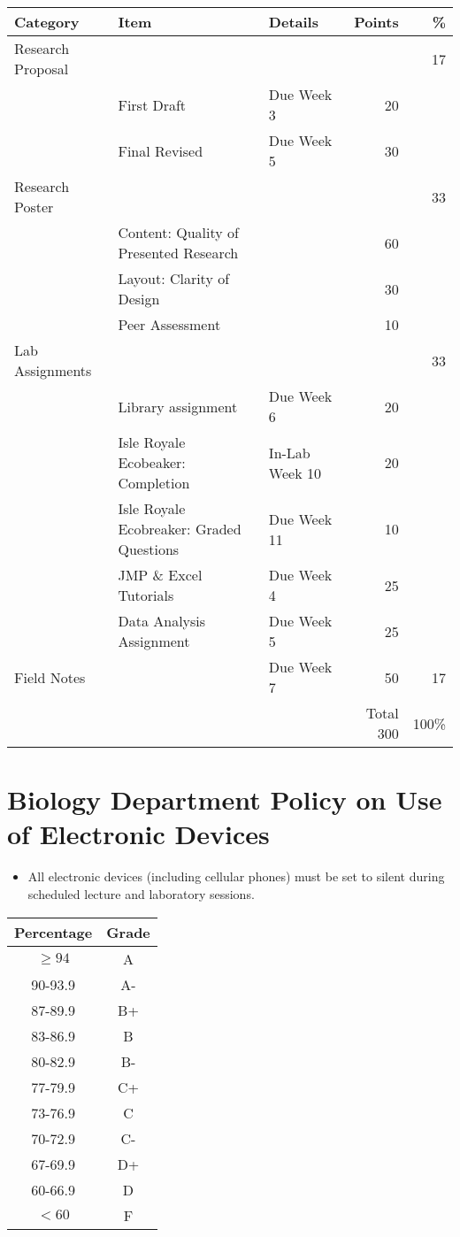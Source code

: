 \documentclass{tufte-handout}
\begin{document}
\begin{fullwidth}
\begin{table}
\begin{tabular}{l l l r r}
Category & Item & Details & Points  & \% \\
\hline
Research Proposal & & &  & 17\\
& First Draft & Due Week 3 & 20 \\
& Final Revised & Due Week 5 & 30 \\
\hline
Research Poster & & & & 33 \\
& Content: Quality of Presented Research && 60 \\
&  Layout: Clarity of Design && 30 \\
&  Peer Assessment && 10 \\
\hline 
Lab Assignments & & & & 33 \\
& Library assignment & Due Week 6 & 20 \\
 & Isle Royale Ecobeaker: Completion & In-Lab Week 10 & 20 \\
& Isle Royale Ecobreaker: Graded Questions & Due Week 11 & 10 \\
& JMP \& Excel Tutorials & Due Week 4 & 25 \\
& Data Analysis Assignment & Due Week 5 & 25 \\
\hline
Field Notes & & Due Week 7 & 50  & 17 \\
\hline
& & & Total 300 & 100\% \\
\end{tabular}
\end{table}

\end{fullwidth}


\section{Biology Department Policy on Use of Electronic Devices}

\begin{itemize}
\item All electronic devices (including cellular phones) must be set to silent during scheduled lecture and laboratory sessions.
\end{itemize}

\begin{margintable}
\begin{tabular}{cc}
Percentage & Grade \\
\hline 
$\ge94$ & A \\
90-93.9 & A- \\
87-89.9 & B+ \\
83-86.9 & B \\
80-82.9 & B- \\
77-79.9 & C+ \\
73-76.9 & C \\
70-72.9 & C- \\
67-69.9 & D+ \\
60-66.9 & D \\
$<60$ & F \\
\hline
\end{tabular}
\end{margintable}
\end{document}
